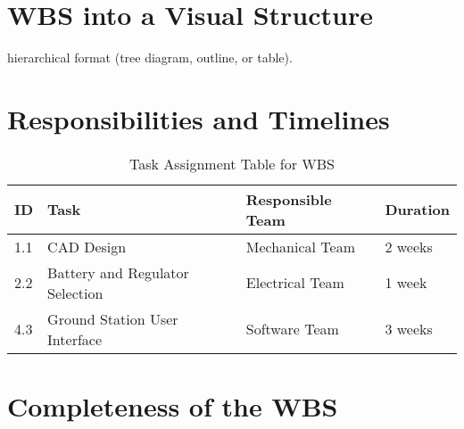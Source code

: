 \documentclass{article}
\begin{document}
\section{WBS into a Visual Structure}

hierarchical format (tree diagram, outline, or table).

\section{Responsibilities and Timelines}

\begin{table}[h!]
    \centering
    \begin{tabular}{llll}
        \toprule
        \textbf{ID} & \textbf{Task} & \textbf{Responsible Team} & \textbf{Duration} \\
        \midrule
        1.1 & CAD Design & Mechanical Team & 2 weeks \\
        2.2 & Battery and Regulator Selection & Electrical Team & 1 week \\
        4.3 & Ground Station User Interface & Software Team & 3 weeks \\
        \bottomrule
    \end{tabular}
    \caption{Task Assignment Table for WBS}
    \label{tab:wbs_tasks}
\end{table}

\section{Completeness of the WBS}
\end{document}
